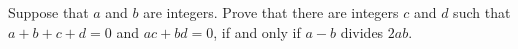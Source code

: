 Suppose that $a$ and $b$ are integers. Prove that there are integers $c$ and $d$ such that $a+b+c+d=0$ and $ac+bd=0$, if and only if $a-b$ divides $2ab$.